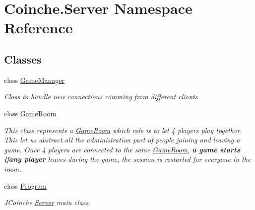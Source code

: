 \hypertarget{namespace_coinche_1_1_server}{}\section{Coinche.\+Server Namespace Reference}
\label{namespace_coinche_1_1_server}
\subsection*{Classes}
\begin{DoxyCompactItemize}
\item 
class \hyperlink{class_coinche_1_1_server_1_1_game_manager}{Game\+Manager}
\begin{DoxyCompactList}\small\item\em Class to handle new connections comming from different clients \end{DoxyCompactList}\item 
class \hyperlink{class_coinche_1_1_server_1_1_game_room}{Game\+Room}
\begin{DoxyCompactList}\small\item\em This class represents a \hyperlink{class_coinche_1_1_server_1_1_game_room}{Game\+Room} which role is to let 4 players play together. This let us abstract all the administration part of people joining and leaving a game. Once 4 players are connected to the same \hyperlink{class_coinche_1_1_server_1_1_game_room}{Game\+Room}, {\bfseries a game starts} If{\bfseries any player} leaves during the game, the session is restarted for everyone in the room. \end{DoxyCompactList}\item 
class \hyperlink{class_coinche_1_1_server_1_1_program}{Program}
\begin{DoxyCompactList}\small\item\em J\+Coinche \hyperlink{namespace_coinche_1_1_server}{Server} main class \end{DoxyCompactList}\end{DoxyCompactItemize}
